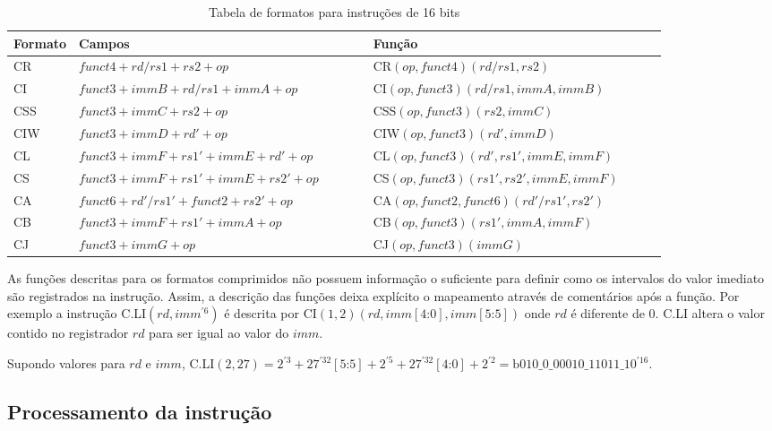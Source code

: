    \begin{table}
      \begin{tabular}{ |p{0.1\linewidth}|p{0.45\linewidth}|p{0.45\linewidth}| } 
        \hline
        Formato & Campos & Função \\ \hline \hline
        CR & $funct4+rd/rs1+rs2+op$ & CR$(op, funct4)(rd/rs1, rs2)$ \\ \hline
        CI & $funct3+immB+rd/rs1+immA+op$ & CI$(op, funct3)(rd/rs1, immA, immB)$ \\ \hline
        CSS & $funct3+immC+rs2+op$ & CSS$(op, funct3)(rs2, immC)$ \\ \hline
        CIW & $funct3+immD+rd'+op$ & CIW$(op, funct3)(rd', immD)$ \\ \hline
        CL & $funct3+immF+rs1'+immE+rd'+op$ & CL$(op, funct3)(rd', rs1', immE, immF)$ \\ \hline
        CS & $funct3+immF+rs1'+immE+rs2'+op$ & CS$(op, funct3)(rs1', rs2', immE, immF)$ \\ \hline
        CA & $funct6+rd'/rs1'+funct2+rs2'+op$ & CA$(op, funct2, funct6)(rd'/rs1', rs2')$ \\ \hline
        CB & $funct3+immF+rs1'+immA+op$ & CB$(op, funct3)(rs1', immA, immF)$ \\ \hline
        CJ & $funct3+immG+op$ & CJ$(op, funct3)(immG)$ \\ \hline
      \end{tabular}
    \caption{Tabela de formatos para instruções de 16 bits \label{tab:if16f}}
    \end{table}

    As funções descritas para os formatos comprimidos não possuem informação o suficiente para definir 
    como os intervalos do valor imediato são registrados na instrução. Assim, a descrição das funções
    deixa explícito o mapeamento através de comentários após a função. 
    Por exemplo a instrução C.LI$(rd, imm^{'6})$ é descrita por CI$(1, 2)(rd, imm[4\text{:}0], imm[5\text{:}5])$
    onde $rd$ é diferente de $0$.
    C.LI altera o valor contido no registrador $rd$ para ser igual ao valor do $imm$.

    Supondo valores para $rd$ e $imm$, C.LI$(2, 27) = 2^{'3} + 27^{'32}[5\text{:}5] +
    2^{'5} + 27^{'32}[4\text{:}0] + 2^{'2} = \text{b}010\_0\_00010\_11011\_10^{'16}$.

\subsection{Processamento da instrução}
\label{sec:nstate}

